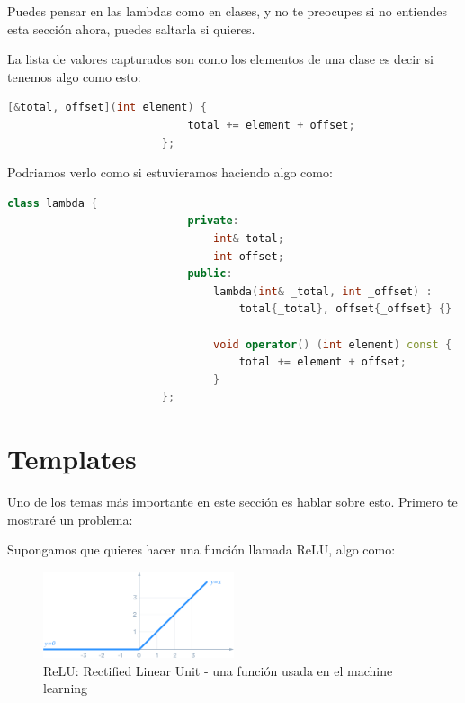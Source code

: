 \documentclass[12pt, fleqn]{report}                             %
\theoremstyle{break}                                            %
\begin{document}
                    Puedes pensar en las lambdas como en clases, y no te preocupes si no entiendes
                    esta sección ahora, puedes saltarla si quieres.

                    La lista de valores capturados son como los elementos de una clase
                    es decir si tenemos algo como esto:

                    \begin{lstlisting}[language=C++, gobble=24]
                        [&total, offset](int element) { 
                            total += element + offset;
                        };
                    \end{lstlisting}

                    Podriamos verlo como si estuvieramos haciendo algo como:
                    \begin{lstlisting}[language=C++, gobble=24]
                        class lambda {
                            private:
                                int& total;
                                int offset;
                            public: 
                                lambda(int& _total, int _offset) : 
                                    total{_total}, offset{_offset} {}

                                void operator() (int element) const { 
                                    total += element + offset;
                                }
                        };
                    \end{lstlisting}

                    \cite{shaharmikeLambdas}


        \clearpage
        \section{Templates}

            Uno de los temas más importante en este sección es hablar sobre esto.
            Primero te mostraré un problema:

            Supongamos que quieres hacer una función llamada ReLU, algo como:
            \begin{figure}[h]
                \includegraphics[width=0.5\textwidth]{ReLU}
                \caption{ReLU: Rectified Linear Unit - una función usada en el machine learning}
            \end{figure}
\end{document}
